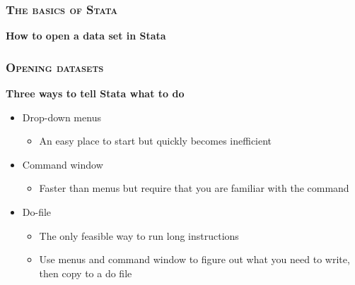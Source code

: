 \documentclass[10pt]{beamer}
\begin{document}
 
		\begin{frame}

			\frametitle{\textsc{The basics of Stata}}
			\begin{center}
				\textbf{How to open a data set in Stata} 
			\end{center}

		\end{frame}


		\begin{frame}
			\frametitle{\textsc{Opening datasets}}
			\begin{center}
				\Large\textbf{Three ways to tell Stata what to do}
			\end{center}
			\begin{itemize}
				\item Drop-down menus
				
				\begin{itemize}
					\item An easy place to start but quickly becomes inefficient
					
				\end{itemize}
				
				\item Command window
				
			\begin{itemize}
				\item Faster than menus but require that you are familiar with the command
				
			\end{itemize}
				\item Do-file
				
			\begin{itemize}
				\item The only feasible way to run long instructions
				
				\item Use menus and command window to figure out what you need to write, then copy to a do file
				
			\end{itemize}
			\end{itemize}
		\end{frame}
\end{document}
